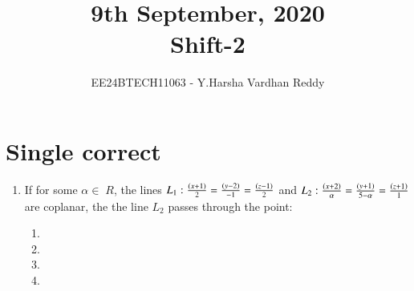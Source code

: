 \documentclass[journal,,12pt,onecolumn]{IEEEtran}
\theoremstyle{remark}
\begin{document}

\vspace{3cm}

\title{9th September, 2020\\Shift-2}
\author{EE24BTECH11063 - Y.Harsha Vardhan Reddy}
\maketitle

\bigskip

\renewcommand{\thefigure}{\theenumi}
\renewcommand{\thetable}{\theenumi}

\section*{Single correct}
\begin{enumerate}
    \item If for some $\alpha\in\;R$, the lines $L_1 : \frac{\left(x+1\right)}{2}=\frac{\left(y-2\right)}{-1}=\frac{\left(z-1\right)}{2}$ and $L_2 : \frac{\left(x+2\right)}{\alpha}=\frac{\left(y+1\right)}{5-\alpha}=\frac{\left(z+1\right)}{1}$ are coplanar, the the line $L_2$ passes through the point:
    \begin{enumerate}
    
        
    
        \item {}
        \item {}
        \item {}
        \item {}
        

\end{enumerate}
\end{enumerate}
\end{document}
